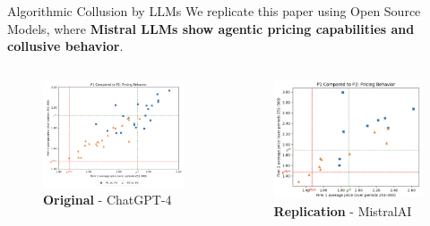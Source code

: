 \documentclass[10pt]{beamer}
\begin{document}
\begin{frame}[fragile]{Algorithmic Collusion by LLMs}
We replicate this paper using Open Source Models, where \textbf{Mistral LLMs show agentic pricing capabilities and collusive behavior}.
\begin{columns}
    \begin{column}{0.55\textwidth}
    \begin{figure}
        \centering
        \includegraphics[width=\linewidth]{imgs/dupoly_experiment.png}
        \caption{\textbf{Original} - ChatGPT-4}
        \label{fig:rep_org}
    \end{figure}
    \end{column}

    \begin{column}{0.55\textwidth}
    \begin{figure}
        \centering
           \includegraphics[width=\linewidth]{slides_pricing_collusion//imgs/replication_dupoly.png}
           \caption{\textbf{Replication} - MistralAI}
        \label{fig:rep_new}
    \end{figure}
    \end{column}
\end{columns}

\end{frame}
\end{document}
